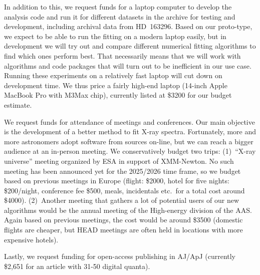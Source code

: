 \documentclass[fleqn,12pt,onecolumn]{SelfArx} %
\begin{document}
In addition to this, we request funds for a laptop computer to develop the analysis code and run it for different datasets in the archive for testing and development, including archival data from HD~163296. Based on our proto-type, we expect to be able to run the fitting on a modern laptop easily, but in development we will try out and compare different numerical fitting algorithms to find which ones perform best. That necessarily means that we will work with algorithms and code packages that will turn out to be inefficient in our use case. Running these experiments on a relatively fast laptop will cut down on development time. We thus price a fairly high-end laptop (14-inch Apple MacBook Pro with M3Max chip), currently listed at \$3200 for our budget estimate.

We request funds for attendance of meetings and conferences. Our main objective is the development of a better method to fit X-ray spectra. Fortunately, more and more astronomers adopt software from sources on-line, but we can reach a bigger audience at an in-person meeting. We conservatively budget two trips: (1)~``X-ray universe'' meeting organized by ESA in support of XMM-Newton. No such meeting has been announced yet for the 2025/2026 time frame, so we budget based on previous meetings in Europe (flight: \$2000, hotel for five nights: \$200/night, conference fee \$500, meals, incidentals etc.\ for a total cost around \$4000). (2)~Another meeting that gathers a lot of potential users of our new algorithms would be the annual meeting of the High-energy division of the AAS. Again based on previous meetings, the cost would be around \$3500 (domestic flights are cheaper, but HEAD meetings are often held in locations with more expensive hotels).

Lastly, we request funding for open-access publishing in AJ/ApJ (currently \$2,651 for an article with 31-50 digital quanta).


\newpage
{}

\setlength\bibsep{0pt}


\end{document}
